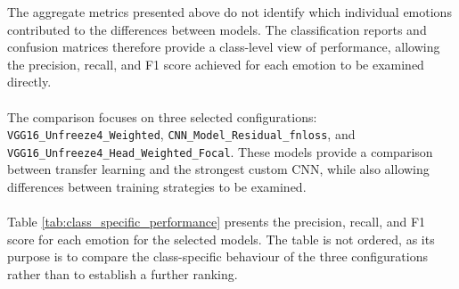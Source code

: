 \documentclass[12pt, a4paper]{report}
\begin{document}
				The aggregate metrics presented above do not identify which individual emotions contributed to the differences between models. The classification reports and confusion matrices therefore provide a class-level view of performance, allowing the precision, recall, and F1 score achieved for each emotion to be examined directly.\\\\
				The comparison focuses on three selected configurations: \\\texttt{VGG16\_Unfreeze4\_Weighted}, \texttt{CNN\_Model\_Residual\_fnloss}, and \\\texttt{VGG16\_Unfreeze4\_Head\_Weighted\_Focal}. These models provide a comparison between transfer learning and the strongest custom CNN, while also allowing differences between training strategies to be examined.\\\\
				Table \ref{tab:class_specific_performance} presents the precision, recall, and F1 score for each emotion for the selected models. The table is not ordered, as its purpose is to compare the class-specific behaviour of the three configurations rather than to establish a further ranking.\\
				\setlength{\tabcolsep}{3pt}
\end{document}
